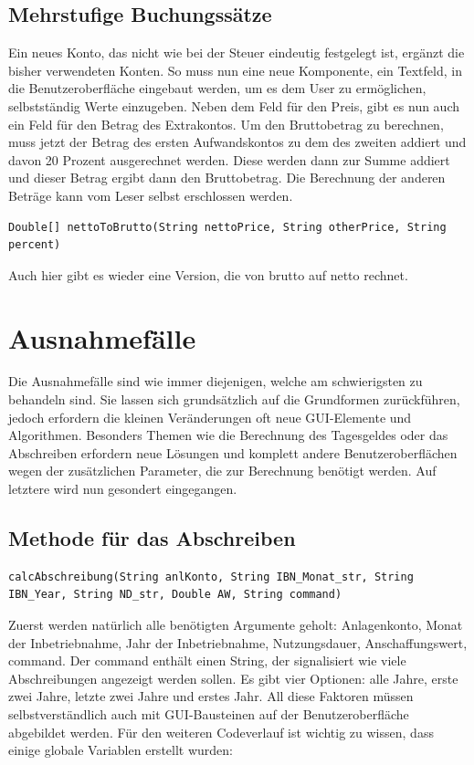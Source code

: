 \documentclass[12pt]{report}
\begin{document}
\subsection{Mehrstufige Buchungssätze}
Ein neues Konto, das nicht wie bei der Steuer eindeutig festgelegt ist, ergänzt die bisher verwendeten Konten. So muss nun eine neue Komponente, ein Textfeld, in die Benutzeroberfläche eingebaut werden, um es dem User zu ermöglichen, selbstständig Werte einzugeben. Neben dem Feld für den Preis, gibt es nun auch ein Feld für den Betrag des Extrakontos. Um den Bruttobetrag zu berechnen, muss jetzt der Betrag des ersten Aufwandskontos zu dem des zweiten addiert und davon 20 Prozent ausgerechnet werden. Diese werden dann zur Summe addiert und dieser Betrag ergibt dann den Bruttobetrag. Die Berechnung der anderen Beträge kann vom Leser selbst erschlossen werden.

\begin{lstlisting}
Double[] nettoToBrutto(String nettoPrice, String otherPrice, String percent)
\end{lstlisting}

\noindent Auch hier gibt es wieder eine Version, die von brutto auf netto rechnet.

\section{Ausnahmefälle}
Die Ausnahmefälle sind wie immer diejenigen, welche am schwierigsten zu behandeln sind. Sie lassen sich grundsätzlich auf die Grundformen zurückführen, jedoch erfordern die kleinen Veränderungen oft neue GUI-Elemente und Algorithmen. Besonders Themen wie die Berechnung des Tagesgeldes oder das Abschreiben erfordern neue Lösungen und komplett andere Benutzeroberflächen wegen der zusätzlichen Parameter, die zur Berechnung benötigt werden. Auf letztere wird nun gesondert eingegangen.


\subsection{Methode für das Abschreiben}
  
\begin{lstlisting}
calcAbschreibung(String anlKonto, String IBN_Monat_str, String IBN_Year, String ND_str, Double AW, String command)
\end{lstlisting}
Zuerst werden natürlich alle benötigten Argumente geholt: Anlagenkonto, Monat der Inbetriebnahme, Jahr der Inbetriebnahme, Nutzungsdauer, Anschaffungswert, command. Der command enthält einen String, der signalisiert wie viele Abschreibungen angezeigt werden sollen. Es gibt vier Optionen: alle Jahre, erste zwei Jahre, letzte zwei Jahre und erstes Jahr. All diese Faktoren müssen selbstverständlich auch mit GUI-Bausteinen auf der Benutzeroberfläche abgebildet werden.
Für den weiteren Codeverlauf ist wichtig zu wissen, dass einige globale Variablen erstellt wurden:\\
\end{document}
